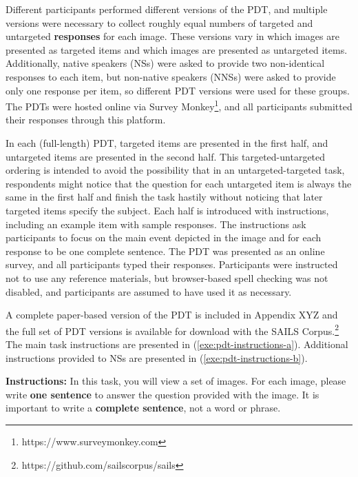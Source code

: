 Different participants performed different versions of the PDT, and multiple versions were necessary to collect roughly equal numbers of targeted and untargeted \textbf{responses} for each image. These versions vary in which images are presented as targeted items and which images are presented as untargeted items. Additionally, native speakers (NSs) were asked to provide two non-identical responses to each item, but non-native speakers (NNSs) were asked to provide only one response per item, so different PDT versions were used for these groups. The PDTs were hosted online via Survey Monkey\footnote{https://www.surveymonkey.com}, and all participants submitted their responses through this platform. %

In each (full-length) PDT, targeted items are presented in the first half, and untargeted items are presented in the second half. This targeted-untargeted ordering is intended to avoid the possibility that in an untargeted-targeted task, respondents might notice that the question for each untargeted item is always the same in the first half and finish the task hastily without noticing that later targeted items specify the subject. Each half is introduced with instructions, including an example item with sample responses. The instructions ask participants to focus on the main event depicted in the image and for each response to be one complete sentence. The PDT was presented as an online survey, and all participants typed their responses. Participants were instructed not to use any reference materials, but browser-based spell checking was not disabled, and participants are assumed to have used it as necessary.

A complete paper-based version of the PDT is included in Appendix XYZ  and the full set of PDT versions is available for download with the SAILS Corpus.\footnote{https://github.com/sailscorpus/sails} The main task instructions are presented in (\ref{exe:pdt-instructions-a}). Additional instructions provided to NSs are presented in (\ref{exe:pdt-instructions-b}).

\begin{exe}
  \ex\label{exe:pdt-instructions-a}\textbf{Instructions:} In this task, you will view a set of images. For each image, please write \textbf{one sentence} to answer the question provided with the image. It is important to write a \textbf{complete sentence}, not a word or phrase.
\end{exe}


